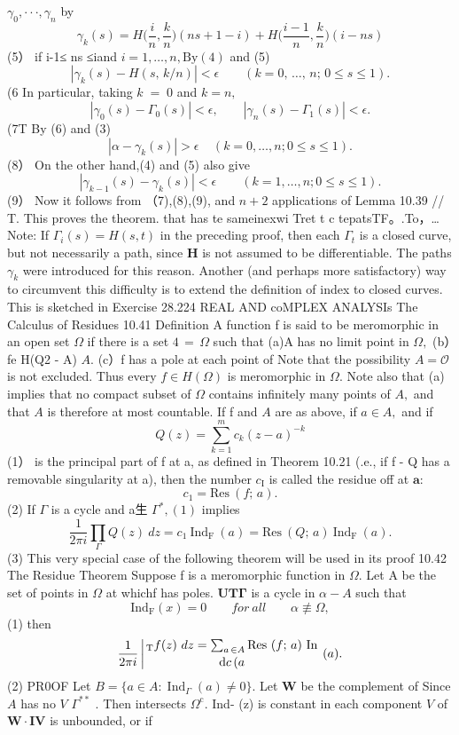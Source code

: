 $\gamma_{0},\cdot\cdot\cdot,\gamma_{n}$ by $$ \gamma_{k}(s)=H{\biggl(}{\frac{i}{n}},{\frac{k}{n}}{\biggr)}(n s+1-i)+H{\biggl(}{\frac{i-1}{n}},{\frac{k}{n}}{\biggr)}(i-n s) $$ (5） if i-1≤ ns ≤iand $i=1,\dots,n,\mathrm{{By}}\left(4\right)$ and (5) $$ |\gamma_{k}(s)-H(s,\,k/n)|<\epsilon\qquad(k=0,\,\ldots,\,n;\,0\leq s\leq1). $$ (6 In particular, taking $\scriptstyle k\;=\;0$ and $k=n,$ $$ |\gamma_{0}(s)-\Gamma_{0}(s)|<\epsilon,\qquad|\gamma_{n}(s)-\Gamma_{1}(s)|<\epsilon. $$ (7T By (6) and (3) $$ |\alpha-\gamma_{k}(s)|>\epsilon~~~~~(k=0,\ldots,n;0\leq s\leq1). $$ (8） On the other hand,(4) and (5) also give $$ |\gamma_{k-1}(s)-\gamma_{k}(s)|<\epsilon\qquad(k=1,\dots,n;0\le s\le1). $$ (9） Now it follows from （7),(8),(9), and $n+2$ applications of Lemma 10.39 // T. This proves the theorem. that has te sameinexwi Tret t c tepatsTF。.To，… Note: If $\Gamma_{i}(s)=H(s,t)$ in the preceding proof, then each $\textstyle\Gamma_{t}$ is a closed curve, but not necessarily a path, since ${\boldsymbol{H}}$ is not assumed to be differentiable. The paths $\gamma_{k}$ were introduced for this reason. Another (and perhaps more satisfactory) way to circumvent this difficulty is to extend the definition of index to closed curves. This is sketched in Exercise 28.224 REAL AND coMPLEX ANALYSIs The Calculus of Residues 10.41 Definition A function f is said to be meromorphic in an open set $\Omega$ if there is a set $\scriptstyle4\,=\,\Omega$ such that (a)A has no limit point in $\Omega,$ (b）fe H(Q2 - A) $A.$ (c）f has a pole at each point of Note that the possibility $A={\mathcal{O}}$ is not excluded. Thus every $f\in H(\Omega)$ is meromorphic in $\Omega.$ Note also that (a) implies that no compact subset of $\Omega$ contains infinitely many points of $A,$ and that $\scriptstyle A$ is therefore at most countable. If f and $\scriptstyle A$ are as above, if $a\in A,$ and if $$ Q(z)=\sum_{k=1}^{m}c_{k}(z-a)^{-k} $$ (1） is the principal part of f at a, as defined in Theorem 10.21 (.e., if f - Q has a removable singularity at a), then the number $c_{\mathrm{I}}$ is called the residue off at ${\boldsymbol{a}}\colon$ $$ c_{1}=\mathrm{Res}\ (f;\,a). $$ (2) If ${\Gamma}$ is a cycle and a生 $\Gamma^{*},(1)$ implies $$ {\frac{1}{2\pi i}}\prod_{\Gamma}^{}Q(z)\ d z=c_{1}\mathrm{~Ind_{F}~}(a)=\mathrm{Res~}(Q;\,a)\mathrm{~Ind_{F}~}(a). $$ (3) This very special case of the following theorem will be used in its proof 10.42 The Residue Theorem Suppose f is a meromorphic function in $\Omega.$ Let A be the set of points in $\Omega$ at whichf has poles. ${\boldsymbol{U}}{\boldsymbol{T}}{\boldsymbol{\Gamma}}$ is a cycle in $\alpha-A$ such that $$ \mathrm{Ind}_{\mathrm{F}}\left(x\right)=0\qquad f o r\ a l l\qquad\alpha\not\equiv\Omega, $$ (1) then $$ {\frac{1}{2\pi i}}\left|_{\mathrm{{T}}}f(z)\,\,d z=\sum_{a\,\in A}\mathrm{{Res}}\,\,(f;\,a)\,\,{\mathrm{In}}\atop{\mathrm{d}}c\,{\mathrm{(}}a\right.\mathrm{(}a\mathrm{)}. $$ (2) PR0OF Let $B=\{a\in A\colon\operatorname{Ind}_{\Gamma}(a)\neq0\}.$ Let ${\boldsymbol{W}}$ be the complement of Since $\scriptstyle A$ has no ${\mathbf{}}V$ $\Gamma^{\ast\ast}$ . Then intersects $\Omega^{\mathrm{c}}.$ Ind- (z) is constant in each component ${\mathbf{}}V$ of ${\boldsymbol{W}}\cdot\mathbf{I}{\boldsymbol{V}}$ is unbounded, or if 